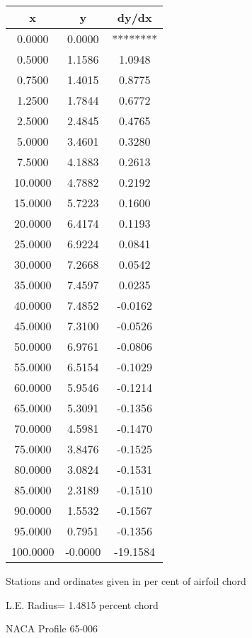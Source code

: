 \documentclass[11pt]{book}
\begin{document}
 \vspace{8mm}
 \begin{tabular}{|c|c|c|} \hline 
  x  &  y  &  dy/dx \\
 \hline
0.0000 & 0.0000 & ******** \\
0.5000 & 1.1586 & 1.0948 \\
0.7500 & 1.4015 & 0.8775 \\
1.2500 & 1.7844 & 0.6772 \\
2.5000 & 2.4845 & 0.4765 \\
5.0000 & 3.4601 & 0.3280 \\
7.5000 & 4.1883 & 0.2613 \\
10.0000 & 4.7882 & 0.2192 \\
15.0000 & 5.7223 & 0.1600 \\
20.0000 & 6.4174 & 0.1193 \\
25.0000 & 6.9224 & 0.0841 \\
30.0000 & 7.2668 & 0.0542 \\
35.0000 & 7.4597 & 0.0235 \\
40.0000 & 7.4852 & -0.0162 \\
45.0000 & 7.3100 & -0.0526 \\
50.0000 & 6.9761 & -0.0806 \\
55.0000 & 6.5154 & -0.1029 \\
60.0000 & 5.9546 & -0.1214 \\
65.0000 & 5.3091 & -0.1356 \\
70.0000 & 4.5981 & -0.1470 \\
75.0000 & 3.8476 & -0.1525 \\
80.0000 & 3.0824 & -0.1531 \\
85.0000 & 2.3189 & -0.1510 \\
90.0000 & 1.5532 & -0.1567 \\
95.0000 & 0.7951 & -0.1356 \\
100.0000 & -0.0000 & -19.1584 \\
 \hline
 \end{tabular}
 \vspace{8mm}


Stations and ordinates given in per cent of airfoil chord 


L.E. Radius=  1.4815 percent chord
 \newpage
  \label{p65-006}
 \begin{Large}
 NACA Profile 65-006
 \end{Large}
  
\end{document}
